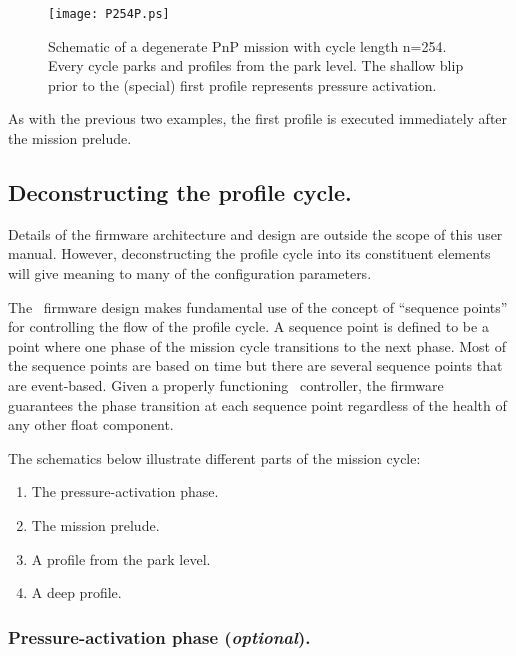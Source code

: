 \begin{figure}[htbp]
  \begin{center}
    \leavevmode
    \mbox{\texttt{[image: P254P.ps]}}
    \caption{Schematic of a degenerate PnP mission with cycle length n=254.
      Every cycle parks and profiles from the park level.  The shallow blip
      prior to the (special) first profile represents pressure activation.}
    \label{fig:P254P} 
  \end{center}
\end{figure}

As with the previous two examples, the first profile is executed
immediately after the mission prelude.

\subsection{Deconstructing the profile cycle.}
\label{sec:DeconstructProfileCycle}

Details of the firmware architecture and design are outside the scope of
this user manual.  However, deconstructing the profile cycle into its
constituent elements will give meaning to many of the configuration
parameters.

The \apf\ firmware design makes fundamental use of the concept of ``sequence
points'' for controlling the flow of the profile cycle.  A sequence point is
defined to be a point where one phase of the mission cycle transitions to
the next phase.  Most of the sequence points are based on time but there are
several sequence points that are event-based.  Given a properly functioning
\apf\ controller, the firmware guarantees the phase transition at each
sequence point regardless of the health of any other float component.

The schematics below illustrate different parts of the mission cycle:
\begin{enumerate}
\item The pressure-activation phase.
\item The mission prelude.
\item A profile from the park level.
\item A deep profile.
\end{enumerate}

\subsubsection{Pressure-activation phase (\emph{optional}).}

